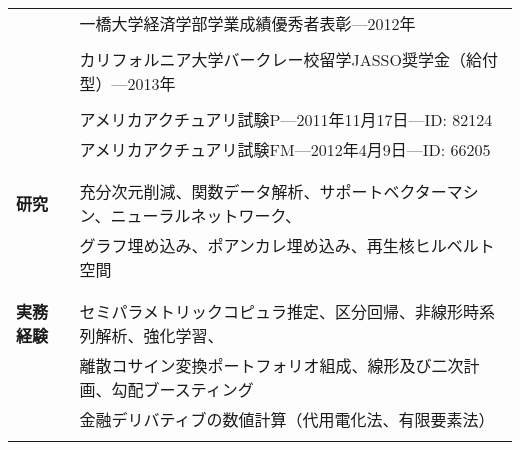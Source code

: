 \documentclass[utf8,letterpaper,oneside]{article}
\begin{document}
\begin{center}
\begin{tabular}{l l}
                      & 一橋大学経済学部学業成績優秀者表彰---2012年                                                    \\
                      &                                                                                                \\
                      & カリフォルニア大学バークレー校留学JASSO奨学金（給付型）---2013年                               \\
                      &                                                                                                \\
                      & アメリカアクチュアリ試験P---2011年11月17日---ID: 82124                                         \\
                      & アメリカアクチュアリ試験FM---2012年4月9日---ID: 66205                                          \\
                      &                                                                                                \\ \hline
                      &                                                                                                \\
  \textbf{研究}       & 充分次元削減、関数データ解析、サポートベクターマシン、ニューラルネットワーク、                 \\
                      & グラフ埋め込み、ポアンカレ埋め込み、再生核ヒルベルト空間                                       \\
                      &                                                                                                \\ \hline
                      &                                                                                                \\
  \textbf{実務経験}   & セミパラメトリックコピュラ推定、区分回帰、非線形時系列解析、強化学習、                         \\
                      & 離散コサイン変換ポートフォリオ組成、線形及び二次計画、勾配ブースティング                       \\
                      & 金融デリバティブの数値計算（代用電化法、有限要素法）                                           \\
                      &                                                                                                \\ \hline

\end{tabular}
\end{center}
\end{document}
